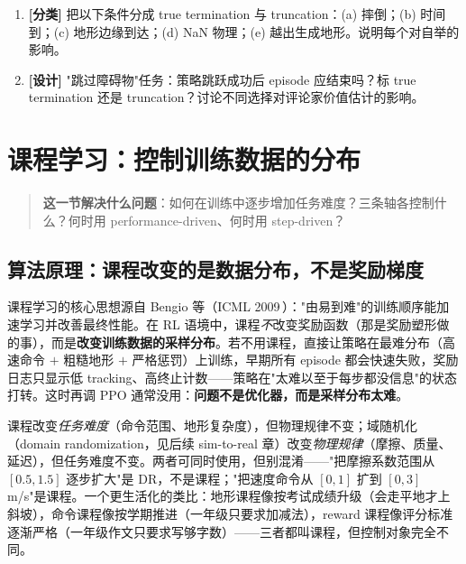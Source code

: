\begin{practice}[练习·终止]
\begin{enumerate}
  \item \textbf{[分类]} 把以下条件分成 true termination 与 truncation：(a) 摔倒；(b) 时间到；(c) 地形边缘到达；(d) NaN 物理；(e) 越出生成地形。说明每个对自举的影响。
  \item \textbf{[设计]} "跳过障碍物"任务：策略跳跃成功后 episode 应结束吗？标 true termination 还是 truncation？讨论不同选择对评论家价值估计的影响。
\end{enumerate}
\end{practice}

\section{课程学习：控制训练数据的分布}
\label{sec:rlmc-rew-curr}

\begin{quote}\small
\textbf{这一节解决什么问题}：如何在训练中逐步增加任务难度？三条轴各控制什么？何时用 performance-driven、何时用 step-driven？
\end{quote}

\subsection{算法原理：课程改变的是数据分布，不是奖励梯度}
\label{sec:rlmc-rew-currtheory}

课程学习的核心思想源自 Bengio 等（ICML 2009\,\cite{bengio2009curriculum}）："由易到难"的训练顺序能加速学习并改善最终性能。在 RL 语境中，课程\emph{不}改变奖励函数（那是奖励塑形做的事），而是\textbf{改变训练数据的采样分布}。若不用课程，直接让策略在最难分布（高速命令 $+$ 粗糙地形 $+$ 严格惩罚）上训练，早期所有 episode 都会快速失败，奖励日志只显示低 tracking、高终止计数——策略在"太难以至于每步都没信息"的状态打转。这时再调 PPO 通常没用：\textbf{问题不是优化器，而是采样分布太难}。

\begin{insight}\label{ins:rlmc-rew-currvsdr}
课程改变\emph{任务难度}（命令范围、地形复杂度），但物理规律不变；域随机化（domain randomization，见后续 sim-to-real 章）改变\emph{物理规律}（摩擦、质量、延迟），但任务难度不变。两者可同时使用，但别混淆——"把摩擦系数范围从 $[0.5,1.5]$ 逐步扩大"是 DR，不是课程；"把速度命令从 $[0,1]$ 扩到 $[0,3]$ m/s"是课程。一个更生活化的类比：地形课程像按考试成绩升级（会走平地才上斜坡），命令课程像按学期推进（一年级只要求加减法），reward 课程像评分标准逐渐严格（一年级作文只要求写够字数）——三者都叫课程，但控制对象完全不同。
\end{insight}

